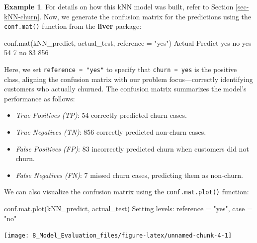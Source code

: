 \documentclass[
  11pt,
]{book}
\makeatletter
\newenvironment{Shaded}{}{}
\newcommand{\AttributeTok}[1]{#1}
\newcommand{\DecValTok}[1]{#1}
\newcommand{\FunctionTok}[1]{#1}
\newcommand{\NormalTok}[1]{#1}
\newcommand{\OtherTok}[1]{\textcolor[rgb]{0.39,0.39,0.39}{#1}}
\newcommand{\SpecialCharTok}[1]{\textcolor[rgb]{0.39,0.39,0.39}{#1}}
\newcommand{\StringTok}[1]{\textcolor[rgb]{0.39,0.39,0.39}{#1}}
\providecommand{\tightlist}{%
  \setlength{\itemsep}{0pt}\setlength{\parskip}{0pt}}
\newenvironment{kframe}{%
\medskip{}
\setlength{\fboxsep}{.8em}
 \def\at@end@of@kframe{}%
 \ifinner\ifhmode%
  \def\at@end@of@kframe{\end{minipage}}%
  \begin{minipage}{\columnwidth}%
 \fi\fi%
 \def\FrameCommand##1{\hskip\@totalleftmargin \hskip-\fboxsep
 \colorbox{shadecolor}{##1}\hskip-\fboxsep
     \hskip-\linewidth \hskip-\@totalleftmargin \hskip\columnwidth}%
 \MakeFramed {\advance\hsize-\width
   \@totalleftmargin\z@ \linewidth\hsize
   \@setminipage}}%
 {\par\unskip\endMakeFramed%
 \at@end@of@kframe}
\renewenvironment{Shaded}{\begin{kframe}}{\end{kframe}}
\theoremstyle{definition}
\theoremstyle{definition}
\newtheorem{example}{Example}[chapter]
\theoremstyle{definition}
\theoremstyle{definition}
\theoremstyle{remark}
\makeatother
\begin{document}
\begin{example}
For details on how this kNN model was built, refer to Section \ref{sec-kNN-churn}. Now, we generate the confusion matrix for the predictions using the \texttt{conf.mat()} function from the \textbf{liver} package:

\begin{Shaded}
\begin{Highlighting}[]
\FunctionTok{conf.mat}\NormalTok{(kNN\_predict, actual\_test, }\AttributeTok{reference =} \StringTok{"yes"}\NormalTok{)}
\NormalTok{          Actual}
\NormalTok{   Predict yes  no}
\NormalTok{       yes  }\DecValTok{54}   \DecValTok{7}
\NormalTok{       no   }\DecValTok{83} \DecValTok{856}
\end{Highlighting}
\end{Shaded}

Here, we set \texttt{reference\ =\ "yes"} to specify that \texttt{churn\ =\ yes} is the positive class, aligning the confusion matrix with our problem focus---correctly identifying customers who actually churned. The confusion matrix summarizes the model's performance as follows:

\begin{itemize}
\tightlist
\item
  \emph{True Positives (TP)}: 54 correctly predicted churn cases.\\
\item
  \emph{True Negatives (TN)}: 856 correctly predicted non-churn cases.\\
\item
  \emph{False Positives (FP)}: 83 incorrectly predicted churn when customers did not churn.\\
\item
  \emph{False Negatives (FN)}: 7 missed churn cases, predicting them as non-churn.
\end{itemize}

We can also visualize the confusion matrix using the \texttt{conf.mat.plot()} function:

\begin{Shaded}
\begin{Highlighting}[]
\FunctionTok{conf.mat.plot}\NormalTok{(kNN\_predict, actual\_test)}
\NormalTok{   Setting levels}\SpecialCharTok{:}\NormalTok{ reference }\OtherTok{=} \StringTok{"yes"}\NormalTok{, case }\OtherTok{=} \StringTok{"no"}
\end{Highlighting}
\end{Shaded}

\begin{center}\texttt{[image: 8\_Model\_Evaluation\_files/figure-latex/unnamed-chunk-4-1]} \end{center}


\end{example}
\end{document}
